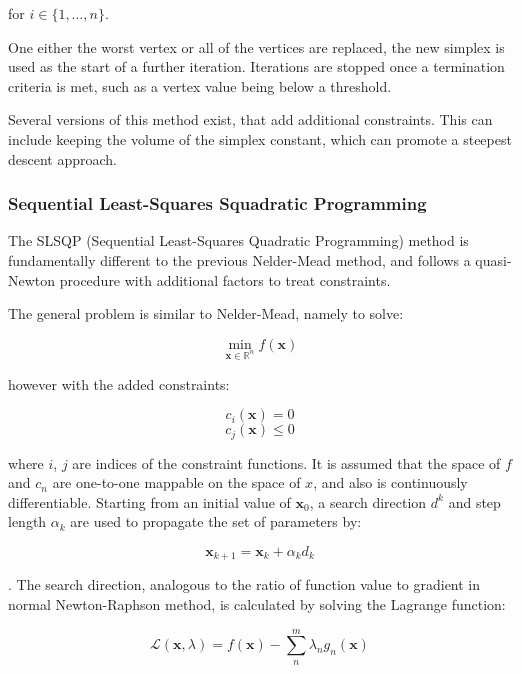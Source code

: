 for $i \in \{1, \dots, n\}$.

One either the worst vertex or all of the vertices are replaced, the new simplex
is used as the start of a further iteration. Iterations are stopped once a termination
criteria is met, such as a vertex value being below a threshold.

Several versions of this method exist, that add additional constraints. This can
include keeping the volume of the simplex constant, which can promote a steepest
descent approach.

\subsubsection{Sequential Least-Squares Squadratic Programming}
\label{subsubsec:slsqp}
The SLSQP (Sequential Least-Squares Quadratic Programming) method is fundamentally
different to the previous Nelder-Mead method, and follows a quasi-Newton procedure
with additional factors to treat constraints.

The general problem is similar to Nelder-Mead, namely to solve:

\begin{equation}
\min_{\mathbf{x} \in \mathbb{R}^n} f\left( \mathbf{x}\right)
\end{equation}

however with the added constraints:

\begin{equation}
c_i \left(\mathbf{x} \right) = 0
\end{equation}
\begin{equation}
c_j \left(\mathbf{x} \right) \leq 0
\end{equation}

where $i$, $j$ are indices of the constraint functions.
It is assumed that the space of $f$ and $c_n$ are one-to-one mappable on the
space of $x$, and also is continuously differentiable. Starting from an initial
value of $\mathbf{x}_0$, a search direction $d^k$ and step length $\alpha_k$ are
used to propagate the set of parameters by:

\begin{equation}
\mathbf{x}_{k+1} = \mathbf{x}_k + \alpha_k d_k
\end{equation}

. The search direction, analogous to the ratio of function value to gradient in 
normal Newton-Raphson method, is calculated by solving the Lagrange function:

\begin{equation}
\mathcal{L} \left(\mathbf{x}, \lambda\right) = f\left(\mathbf{x}\right) - \sum^m_n \lambda_n g_n \left( \mathbf{x}\right)
\end{equation}

